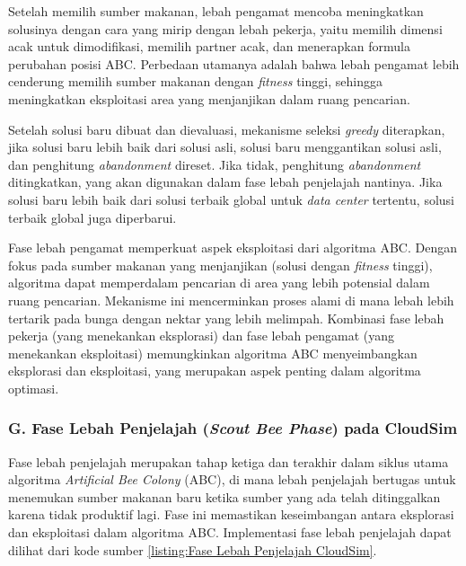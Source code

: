 Setelah memilih sumber makanan, lebah pengamat mencoba meningkatkan solusinya dengan cara yang mirip dengan lebah pekerja, yaitu memilih dimensi acak untuk dimodifikasi, memilih partner acak, dan menerapkan formula perubahan posisi ABC. Perbedaan utamanya adalah bahwa lebah pengamat lebih cenderung memilih sumber makanan dengan \textit{fitness} tinggi, sehingga meningkatkan eksploitasi area yang menjanjikan dalam ruang pencarian.

Setelah solusi baru dibuat dan dievaluasi, mekanisme seleksi \textit{greedy} diterapkan, jika solusi baru lebih baik dari solusi asli, solusi baru menggantikan solusi asli, dan penghitung \textit{abandonment} direset. Jika tidak, penghitung \textit{abandonment} ditingkatkan, yang akan digunakan dalam fase lebah penjelajah nantinya. Jika solusi baru lebih baik dari solusi terbaik global untuk \textit{data center} tertentu, solusi terbaik global juga diperbarui.

Fase lebah pengamat memperkuat aspek eksploitasi dari algoritma ABC. Dengan fokus pada sumber makanan yang menjanjikan (solusi dengan \textit{fitness} tinggi), algoritma dapat memperdalam pencarian di area yang lebih potensial dalam ruang pencarian. Mekanisme ini mencerminkan proses alami di mana lebah lebih tertarik pada bunga dengan nektar yang lebih melimpah. Kombinasi fase lebah pekerja (yang menekankan eksplorasi) dan fase lebah pengamat (yang menekankan eksploitasi) memungkinkan algoritma ABC menyeimbangkan eksplorasi dan eksploitasi, yang merupakan aspek penting dalam algoritma optimasi.

\subsubsection{G. Fase Lebah Penjelajah (\textit{Scout Bee Phase}) pada CloudSim}
Fase lebah penjelajah merupakan tahap ketiga dan terakhir dalam siklus utama algoritma \textit{Artificial Bee Colony }(ABC), di mana lebah penjelajah bertugas untuk menemukan sumber makanan baru ketika sumber yang ada telah ditinggalkan karena tidak produktif lagi. Fase ini memastikan keseimbangan antara eksplorasi dan eksploitasi dalam algoritma ABC. Implementasi fase lebah penjelajah dapat dilihat dari kode sumber \ref{listing:Fase Lebah Penjelajah CloudSim}.

